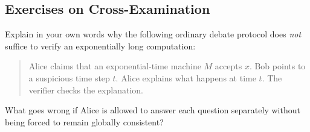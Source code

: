 \documentclass[11pt]{article}
\begin{document}








\subsection{Exercises on Cross-Examination}

\begin{exercise}
\label{ex:from-ordinary-debate-to-cross-examinatio}
Explain in your own words why the following ordinary debate protocol does \emph{not} suffice to verify an exponentially long computation:

\begin{quote}
Alice claims that an exponential-time machine \(M\) accepts \(x\).  
Bob points to a suspicious time step \(t\).  
Alice explains what happens at time \(t\).  
The verifier checks the explanation.
\end{quote}

What goes wrong if Alice is allowed to answer each question separately without being forced to remain globally consistent?
\end{exercise}
\end{document}
